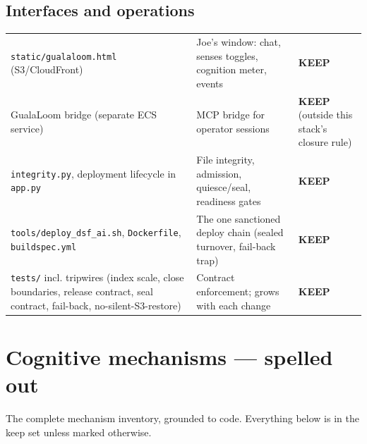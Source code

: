 \documentclass[11pt]{article}
\newcommand{\keep}{\textbf{KEEP}}
\begin{document}
\subsection{Interfaces and operations}
\begin{longtable}{p{} p{} p{}}
\toprule
\texttt{static/gualaloom.html} (S3/CloudFront) &
Joe's window: chat, senses toggles, cognition meter, events &
\keep{} \\
GualaLoom bridge (separate ECS service) &
MCP bridge for operator sessions &
\keep{} (outside this stack's closure rule) \\
\texttt{integrity.py}, deployment lifecycle in \texttt{app.py} &
File integrity, admission, quiesce/seal, readiness gates &
\keep{} \\
\texttt{tools/deploy\_dsf\_ai.sh}, \texttt{Dockerfile},
\texttt{buildspec.yml} &
The one sanctioned deploy chain (sealed turnover, fail-back trap) &
\keep{} \\
\texttt{tests/} incl. tripwires (index scale, close boundaries, release
contract, seal contract, fail-back, no-silent-S3-restore) &
Contract enforcement; grows with each change &
\keep{} \\
\bottomrule
\end{longtable}

\section{Cognitive mechanisms — spelled out}\label{sec:mechanisms}

The complete mechanism inventory, grounded to code. Everything below is in
the keep set unless marked otherwise.
\end{document}
